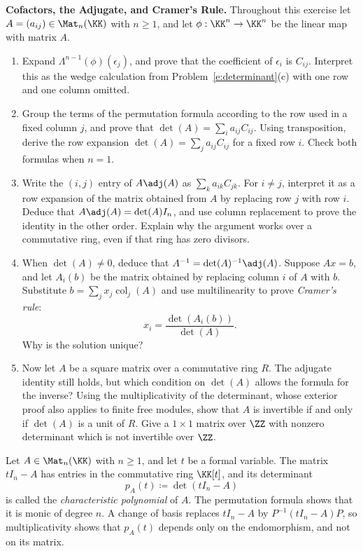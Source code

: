 \documentclass[12pt,reqno]{amsart}
\begin{document}
\hrulefill

\begin{problems}
\item\label{e:adjugate} \textbf{Cofactors, the Adjugate, and Cramer's Rule.} Throughout this exercise let $A=(a_{ij})\in\Mat_n(\KK)$ with $n\geq1$, and let $\phi:\KK^n\to\KK^n$ be the linear map with matrix $A$.
\begin{enumerate}
\item Expand $\Lambda^{n-1}(\phi)(\epsilon_j)$, and prove that the coefficient of $\epsilon_i$ is $C_{ij}$. Interpret this as the wedge calculation from Problem~\ref{e:determinant}(c) with one row and one column omitted.
\item Group the terms of the permutation formula according to the row used in a fixed column $j$, and prove that $\det(A)=\sum_ia_{ij}C_{ij}$. Using transposition, derive the row expansion $\det(A)=\sum_ja_{ij}C_{ij}$ for a fixed row $i$. Check both formulas when $n=1$.
\item Write the $(i,j)$ entry of $A\adj(A)$ as $\sum_ka_{ik}C_{jk}$. For $i\ne j$, interpret it as a row expansion of the matrix obtained from $A$ by replacing row $j$ with row $i$. Deduce that $A\adj(A)=\det(A)I_n$, and use column replacement to prove the identity in the other order. Explain why the argument works over a commutative ring, even if that ring has zero divisors.
\item When $\det(A)\ne0$, deduce that $A^{-1}=\det(A)^{-1}\adj(A)$. Suppose $Ax=b$, and let $A_i(b)$ be the matrix obtained by replacing column $i$ of $A$ with $b$. Substitute $b=\sum_jx_j\operatorname{col}_j(A)$ and use multilinearity to prove \emph{Cramer's rule}:
\[
x_i=\frac{\det(A_i(b))}{\det(A)}.
\]
Why is the solution unique?
\item Now let $A$ be a square matrix over a commutative ring $R$. The adjugate identity still holds, but which condition on $\det(A)$ allows the formula for the inverse? Using the multiplicativity of the determinant, whose exterior proof also applies to finite free modules, show that $A$ is invertible if and only if $\det(A)$ is a unit of $R$. Give a $1\times1$ matrix over $\ZZ$ with nonzero determinant which is not invertible over $\ZZ$.
\end{enumerate}
\end{problems}

\hrulefill

Let $A\in\Mat_n(\KK)$ with $n\geq1$, and let $t$ be a formal variable. The matrix $tI_n-A$ has entries in the commutative ring $\KK[t]$, and its determinant
\[
p_A(t)\coloneqq\det(tI_n-A)
\]
is called the \emph{characteristic polynomial} of $A$. The permutation formula shows that it is monic of degree $n$. A change of basis replaces $tI_n-A$ by $P^{-1}(tI_n-A)P$, so multiplicativity shows that $p_A(t)$ depends only on the endomorphism, and not on its matrix.
\end{document}
